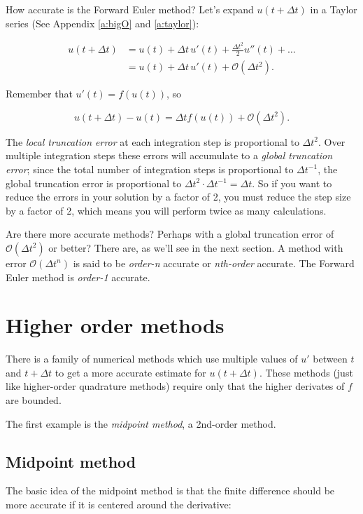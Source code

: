 \documentclass{article}
\newcommand{\dt}{\Delta t}
\newcommand{\bigO}{\mathcal{O}}
\begin{document}
How accurate is the Forward Euler method? Let's expand $u(t+\dt)$ in a Taylor series
(See Appendix \ref{a:bigO} and \ref{a:taylor}):

\begin{align*}
    u(t+\dt) &= u(t) + \dt \, u'(t) + \frac{\dt^2}{2} u''(t) + \ldots \\
    {} &= u(t) + \dt \, u'(t) + \bigO(\dt^2).
\end{align*}

Remember that $u'(t) = f(u(t))$, so 

\begin{equation}
    u(t+\dt) - u(t) = \dt f(u(t)) + \bigO(\dt^2).
\end{equation}

The \emph{local truncation error} at each integration step is proportional to $\dt^2$.
Over multiple integration steps these errors will accumulate to a \emph{global truncation error};
since the total number of integration steps is proportional to $\dt^{-1}$,
the global truncation error is proportional to $\dt^2 \cdot \dt^{-1} = \dt$.
So if you want to reduce the errors in your solution by a factor of 2,
you must reduce the step size by a factor of 2, which means you will perform twice as many
calculations.

Are there more accurate methods? Perhaps with a global truncation error of $\bigO(\dt^2)$ or better?
There are, as we'll see in the next section. A method with error $\bigO(\dt^n)$ 
is said to be \emph{order-n} accurate or \emph{nth-order} accurate.
The Forward Euler method is \emph{order-1} accurate.

\section{Higher order methods}

There is a family of numerical methods which use multiple
values of $u'$ between $t$ and $t+\dt$ to get a more accurate estimate for $u(t+\dt)$.
These methods (just like higher-order quadrature methods) require only that the higher derivates 
of $f$ are bounded.

The first example is the \emph{midpoint method}, a 2nd-order method.

\subsection{Midpoint method}

The basic idea of the midpoint method is that the finite difference should be more accurate
if it is centered around the derivative:
\end{document}
